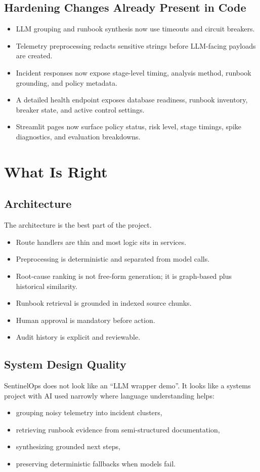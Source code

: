 \documentclass[11pt]{article}
\begin{document}
\subsection{Hardening Changes Already Present in Code}
\begin{itemize}[leftmargin=*]
\item LLM grouping and runbook synthesis now use timeouts and circuit breakers.
\item Telemetry preprocessing redacts sensitive strings before LLM-facing payloads are created.
\item Incident responses now expose stage-level timing, analysis method, runbook grounding, and policy metadata.
\item A detailed health endpoint exposes database readiness, runbook inventory, breaker state, and active control settings.
\item Streamlit pages now surface policy status, risk level, stage timings, spike diagnostics, and evaluation breakdowns.
\end{itemize}

\section{What Is Right}
\subsection{Architecture}
The architecture is the best part of the project.
\begin{itemize}[leftmargin=*]
\item Route handlers are thin and most logic sits in services.
\item Preprocessing is deterministic and separated from model calls.
\item Root-cause ranking is not free-form generation; it is graph-based plus historical similarity.
\item Runbook retrieval is grounded in indexed source chunks.
\item Human approval is mandatory before action.
\item Audit history is explicit and reviewable.
\end{itemize}

\subsection{System Design Quality}
SentinelOps does not look like an ``LLM wrapper demo''. It looks like a systems project with AI used narrowly where language understanding helps:
\begin{itemize}[leftmargin=*]
\item grouping noisy telemetry into incident clusters,
\item retrieving runbook evidence from semi-structured documentation,
\item synthesizing grounded next steps,
\item preserving deterministic fallbacks when models fail.
\end{itemize}
\end{document}
